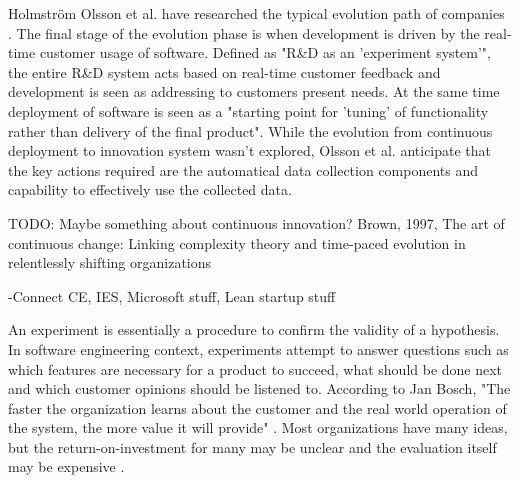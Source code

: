 \documentclass[english]{tktltiki2}
\theoremstyle{definition}
\theoremstyle{remark}
\begin{document}
Holmström Olsson et al. have researched the typical evolution path of companies \cite{olsson2012climbing}. The final stage of the evolution phase is when development is driven by the real-time customer usage of software. Defined as "R\&D as an 'experiment system'", the entire R\&D system acts based on real-time customer feedback and development is seen as addressing to customers present needs. At the same time deployment of software is seen as a "starting point for 'tuning' of functionality rather than delivery of the final product". While the evolution from continuous deployment to innovation system wasn't explored, Olsson et al. anticipate that the key actions required are the automatical data collection components and capability to effectively use the collected data.

TODO: Maybe something about continuous innovation? Brown, 1997, The art of continuous change: Linking complexity theory and time-paced evolution in relentlessly shifting organizations

-Connect CE, IES, Microsoft stuff, Lean startup stuff


An experiment is essentially a procedure to confirm the validity of a hypothesis. In software engineering context, experiments attempt to answer questions such as which features are necessary for a product to succeed, what should be done next and which customer opinions should be listened to. According to Jan Bosch, "The faster the organization learns about the customer and the real world operation of the system, the more value it will provide" \cite{bosch2012building}. Most organizations have many ideas, but the return-on-investment for many may be unclear and the evaluation itself may be expensive \cite{kohavi2007practical}. 
\end{document}
